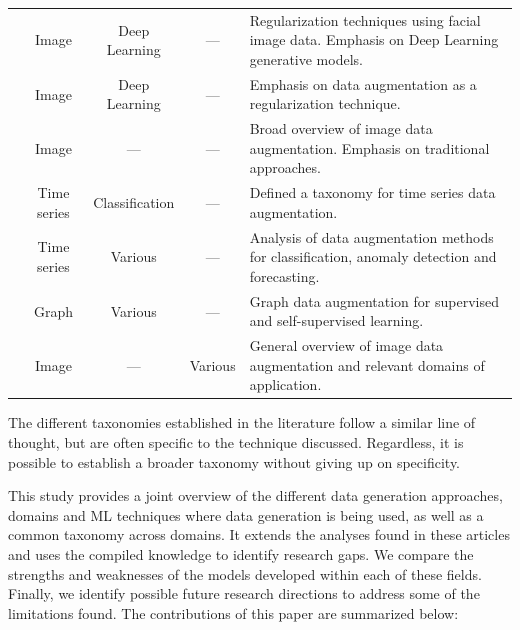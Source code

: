 \documentclass[parskip=full]{scrartcl}
\begin{document}
\begin{table}[t!]
\begin{tabularx}{\textwidth}{@{}rcccX@{}}
        \citet{wang2020survey} & Image & Deep Learning & --- & Regularization
        techniques using facial image data. Emphasis on Deep Learning
        generative models.\\

        \citet{shorten2019survey} & Image & Deep Learning & --- & Emphasis on
        data augmentation as a regularization technique.\\

        \citet{khosla2020enhancing} & Image & --- & --- & Broad overview of
        image data augmentation. Emphasis on traditional approaches. \\

        \citet{iwana2021empirical} & Time series & Classification & --- &
        Defined a taxonomy for time series data augmentation.\\

        \citet{wen2020time} & Time series & Various & --- & Analysis of data
        augmentation methods for classification, anomaly detection and
        forecasting.\\

        \citet{zhao2022graph} & Graph & Various & --- & Graph data
        augmentation for supervised and self-supervised learning.\\

        \citet{khalifa2021comprehensive} & Image & --- & Various & General
        overview of image data augmentation and relevant domains of
        application.\\

        \bottomrule
        
    \end{tabularx}
\end{table}


The different taxonomies established in the literature follow a similar line
of thought, but are often specific to the technique discussed. Regardless, it
is possible to establish a broader taxonomy without giving up on specificity.

This study provides a joint overview of the different data generation
approaches, domains and ML techniques where data generation is being used, as
well as a common taxonomy across domains. It extends the analyses found in
these articles and uses the compiled knowledge to identify research gaps. We
compare the strengths and weaknesses of the models developed within each of
these fields. Finally, we identify possible future research directions to
address some of the limitations found. The contributions of this paper are
summarized below:
\end{document}
